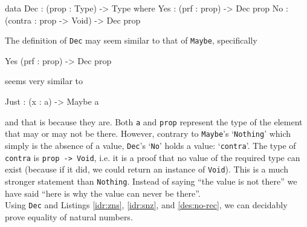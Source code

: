         \begin{code}[caption={\texttt{Dec} as defined in the \Idris prelude}]
        data Dec : (prop : Type) -> Type where
            Yes : (prf : prop) -> Dec prop
            No  : (contra : prop -> Void) -> Dec prop
        \end{code}
        The definition of \texttt{Dec} may seem similar to that of \texttt{Maybe}, specifically
        
        \begin{code}
        Yes (prf : prop) -> Dec prop
        \end{code}
        seems very similar to
    
        \begin{code}
        Just : (x : a) -> Maybe a
        \end{code}
        and that is because they are. Both \texttt{a} and \texttt{prop} represent the type of the element that may or may not be there. However, contrary to \texttt{Maybe}'s `\texttt{Nothing}' which simply is the absence of a value, \texttt{Dec}'s `\texttt{No}' holds a value: `\texttt{contra}'. The type of \texttt{contra} is \texttt{prop -> Void}, i.e. it is a proof that no value of the required type can exist (because if it did, we could return an instance of \texttt{Void}). This is a much stronger statement than \texttt{Nothing}. Instead of saying ``the value is not there'' we have said ``here is why the value can never be there''.
        \\
        
        Using \texttt{Dec} and Listings \ref{idr:zns}, \ref{idr:snz}, and \ref{des:no-rec}, we can decidably prove equality of natural numbers.
        
